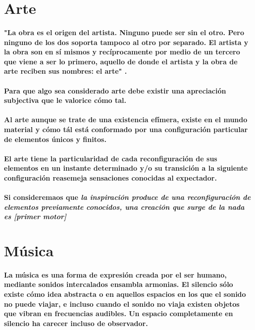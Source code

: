 \section {Arte}

\paragraph{
  "La obra es el origen del artista. Ninguno puede ser sin el otro. Pero ninguno de los dos soporta tampoco al otro por separado. El artista y la obra son en sí mismos y recíprocamente por medio de un tercero que viene a ser lo primero, aquello de donde el artista y la obra de arte reciben sus nombres: el arte" \cite{heidegger-1936}.
}

\paragraph{
  Para que algo sea considerado arte debe existir una apreciación subjectiva que le valorice cómo tal.
}

\paragraph{
  Al arte aunque se trate de una existencia efímera, existe en el mundo material y cómo tál está conformado por una configuración particular de elementos únicos y finitos.
}

\paragraph{
  El arte tiene la particularidad de cada reconfiguración de sus elementos en un instante determinado y/o su transición a la siguiente configuración reasemeja sensaciones conocidas al expectador.
}

\paragraph{
  Si consideremaos que \it{la inspiración} produce de una reconfiguración de elementos previamente conocidos, una creación que surge de la nada es [primer motor]
}


\section{Música}

\paragraph{
  La música es una forma de expresión creada por el ser humano, mediante sonidos intercalados ensambla armonias.
  El silencio sólo existe cómo idea abstracta o en aquellos espacios en los que el sonido no puede viajar, e incluso cuando el sonido no viaja existen objetos que vibran en frecuencias audibles. Un espacio completamente en silencio ha carecer incluso de observador.
}
